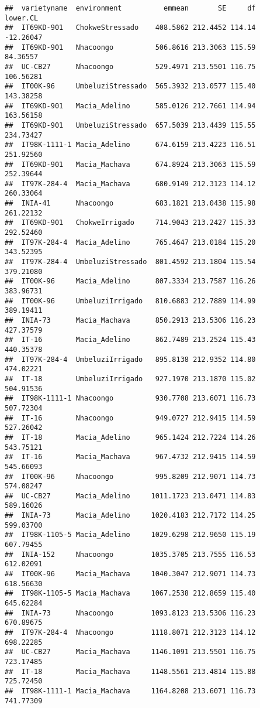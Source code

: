 \documentclass[]{book}
\theoremstyle{definition}
\theoremstyle{definition}
\theoremstyle{definition}
\theoremstyle{remark}
\begin{document}
\begin{verbatim}
##  varietyname  environment          emmean       SE     df   lower.CL
##  IT69KD-901   ChokweStressado    408.5862 212.4452 114.14  -12.26047
##  IT69KD-901   Nhacoongo          506.8616 213.3063 115.59   84.36557
##  UC-CB27      Nhacoongo          529.4971 213.5501 116.75  106.56281
##  IT00K-96     UmbeluziStressado  565.3932 213.0577 115.40  143.38258
##  IT69KD-901   Macia_Adelino      585.0126 212.7661 114.94  163.56158
##  IT69KD-901   UmbeluziStressado  657.5039 213.4439 115.55  234.73427
##  IT98K-1111-1 Macia_Adelino      674.6159 213.4223 116.51  251.92560
##  IT69KD-901   Macia_Machava      674.8924 213.3063 115.59  252.39644
##  IT97K-284-4  Macia_Machava      680.9149 212.3123 114.12  260.33064
##  INIA-41      Nhacoongo          683.1821 213.0438 115.98  261.22132
##  IT69KD-901   ChokweIrrigado     714.9043 213.2427 115.33  292.52460
##  IT97K-284-4  Macia_Adelino      765.4647 213.0184 115.20  343.52395
##  IT97K-284-4  UmbeluziStressado  801.4592 213.1804 115.54  379.21080
##  IT00K-96     Macia_Adelino      807.3334 213.7587 116.26  383.96731
##  IT00K-96     UmbeluziIrrigado   810.6883 212.7889 114.99  389.19411
##  INIA-73      Macia_Machava      850.2913 213.5306 116.23  427.37579
##  IT-16        Macia_Adelino      862.7489 213.2524 115.43  440.35378
##  IT97K-284-4  UmbeluziIrrigado   895.8138 212.9352 114.80  474.02221
##  IT-18        UmbeluziIrrigado   927.1970 213.1870 115.02  504.91536
##  IT98K-1111-1 Nhacoongo          930.7708 213.6071 116.73  507.72304
##  IT-16        Nhacoongo          949.0727 212.9415 114.59  527.26042
##  IT-18        Macia_Adelino      965.1424 212.7224 114.26  543.75121
##  IT-16        Macia_Machava      967.4732 212.9415 114.59  545.66093
##  IT00K-96     Nhacoongo          995.8209 212.9071 114.73  574.08247
##  UC-CB27      Macia_Adelino     1011.1723 213.0471 114.83  589.16026
##  INIA-73      Macia_Adelino     1020.4183 212.7172 114.25  599.03700
##  IT98K-1105-5 Macia_Adelino     1029.6298 212.9650 115.19  607.79455
##  INIA-152     Nhacoongo         1035.3705 213.7555 116.53  612.02091
##  IT00K-96     Macia_Machava     1040.3047 212.9071 114.73  618.56630
##  IT98K-1105-5 Macia_Machava     1067.2538 212.8659 115.40  645.62284
##  INIA-73      Nhacoongo         1093.8123 213.5306 116.23  670.89675
##  IT97K-284-4  Nhacoongo         1118.8071 212.3123 114.12  698.22285
##  UC-CB27      Macia_Machava     1146.1091 213.5501 116.75  723.17485
##  IT-18        Macia_Machava     1148.5561 213.4814 115.88  725.72450
##  IT98K-1111-1 Macia_Machava     1164.8208 213.6071 116.73  741.77309

\end{verbatim}
\end{document}
